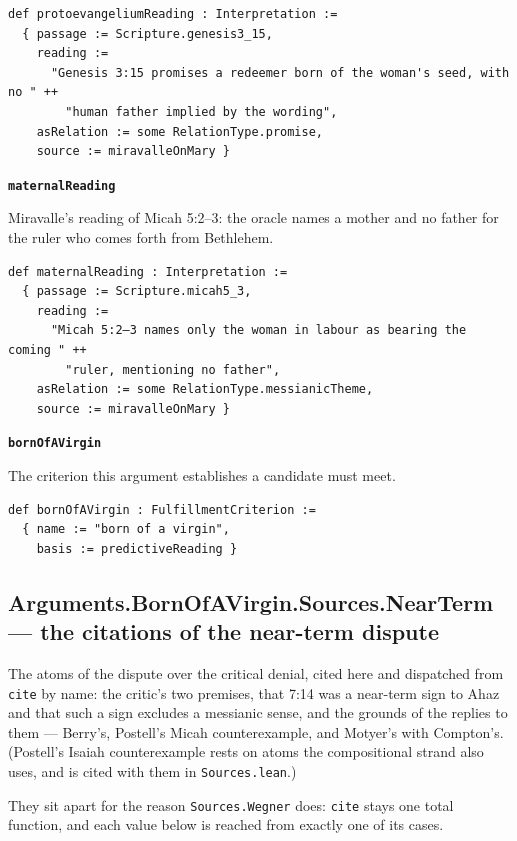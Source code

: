 \documentclass[11pt]{article}
\begin{document}
{\small\begin{verbatim}
def protoevangeliumReading : Interpretation :=
  { passage := Scripture.genesis3_15,
    reading :=
      "Genesis 3:15 promises a redeemer born of the woman's seed, with no " ++
        "human father implied by the wording",
    asRelation := some RelationType.promise,
    source := miravalleOnMary }
\end{verbatim}}
\par\medskip\noindent\textbf{\texttt{maternal\allowbreak{}Reading}}\par\nobreak\noindent
Miravalle's reading of Micah 5:2–3: the oracle names a mother and no father for the ruler who comes forth from Bethlehem.

{\small\begin{verbatim}
def maternalReading : Interpretation :=
  { passage := Scripture.micah5_3,
    reading :=
      "Micah 5:2–3 names only the woman in labour as bearing the coming " ++
        "ruler, mentioning no father",
    asRelation := some RelationType.messianicTheme,
    source := miravalleOnMary }
\end{verbatim}}
\par\medskip\noindent\textbf{\texttt{born\allowbreak{}Of\allowbreak{}AVirgin}}\par\nobreak\noindent
The criterion this argument establishes a candidate must meet.

{\small\begin{verbatim}
def bornOfAVirgin : FulfillmentCriterion :=
  { name := "born of a virgin",
    basis := predictiveReading }
\end{verbatim}}
\subsection*{Arguments.BornOfAVirgin.Sources.NearTerm — the citations of the near-term dispute}
The atoms of the dispute over the critical denial, cited here and dispatched from \texttt{cite} by name: the critic's two premises, that 7:14 was a near-term sign to Ahaz and that such a sign excludes a messianic sense, and the grounds of the replies to them — Berry's, Postell's Micah counterexample, and Motyer's with Compton's. (Postell's Isaiah counterexample rests on atoms the compositional strand also uses, and is cited with them in \texttt{Sources.lean}.)

They sit apart for the reason \texttt{Sources.Wegner} does: \texttt{cite} stays one total function, and each value below is reached from exactly one of its cases.
\end{document}
